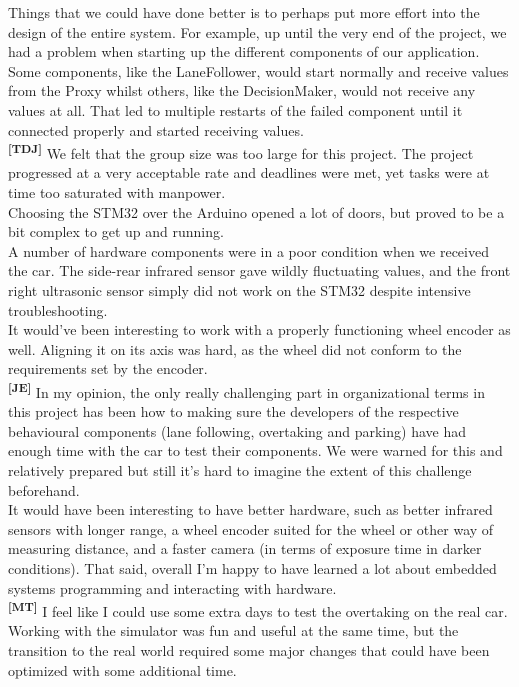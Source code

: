 \noindent
Things that we could have done better is to perhaps put more effort into the
design of the entire system. For example, up until the very end of the project,
we had a problem when starting up the different components of our application.
Some components, like the LaneFollower, would start normally and receive values
from the Proxy whilst others, like the DecisionMaker, would not receive any
values at all. That led to multiple restarts of the failed component until it
connected properly and started receiving values.\\

\noindent
\textsuperscript{\textbf{[TDJ]}}
We felt that the group size was too large for this project. The project
progressed at a very acceptable rate and deadlines were met, yet tasks were at
time too saturated with manpower.\\
Choosing the STM32 over the Arduino opened a lot of doors, but proved to be a
bit complex to get up and running.\\
A number of hardware components were in a poor condition when we received the
car. The side-rear infrared sensor gave wildly fluctuating values, and the front
right ultrasonic sensor simply did not work on the STM32 despite intensive
troubleshooting.\\
It would’ve been interesting to work with a properly functioning wheel encoder
as well. Aligning it on its axis was hard, as the wheel did not conform to the
requirements set by the encoder.\\

\noindent
\textsuperscript{\textbf{[JE]}}
In my opinion, the only really challenging part in organizational terms in this
project has been how to making sure the developers of the respective behavioural
components (lane following, overtaking and parking) have had enough time with
the car to test their components. We were warned for this and relatively
prepared but still it's hard to imagine the extent of this challenge
beforehand.\\

\noindent
It would have been interesting to have better hardware, such as better infrared
sensors with longer range, a wheel encoder suited for the wheel or other way of
measuring distance, and a faster camera (in terms of exposure time in darker
conditions). That said, overall I'm happy to have learned a lot about embedded
systems programming and interacting with hardware.\\

\noindent
\textsuperscript{\textbf{[MT]}}
I feel like I could use some extra days to test the overtaking on the real car.
Working with the simulator was fun and useful at the same time, but the
transition to the real world required some major changes that could have been
optimized with some additional time.\\

